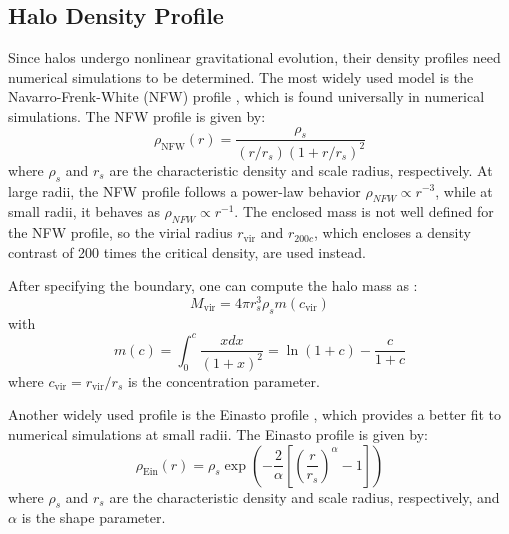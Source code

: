 \subsection{Halo Density Profile}
Since halos undergo nonlinear gravitational evolution, their density profiles need numerical simulations to be determined. The most widely used model is the Navarro-Frenk-White (NFW) profile \citep{1996ApJ...462..563N, 1997ApJ...490..493N}, which is found universally in numerical simulations. The NFW profile is given by:
\begin{equation}
    \rho_\text{NFW}(r) = \frac{\rho_s}{(r/r_s)(1 + r/r_s)^2}
\end{equation}
where $\rho_s$ and $r_s$ are the characteristic density and scale radius, respectively. At large radii, the NFW profile follows a power-law behavior $\rho_{NFW} \propto r^{-3}$, while at small radii, it behaves as $\rho_{NFW} \propto r^{-1}$. The enclosed mass is not well defined for the NFW profile, so the virial radius $r_{\text{vir}}$ and $r_{200c}$, which encloses a density contrast of 200 times the critical density, are used instead.

After specifying the boundary, one can compute the halo mass as \citep{2011MNRAS.414.1851O}:
\begin{equation}
    M_{\text{vir}} = 4\pi r_s^3 \rho_s m(c_{\text{vir}})
\end{equation}
with
\begin{equation}
    m(c) = \int_0^{c} \frac{x dx}{(1 + x)^2} = \ln(1 + c) - \frac{c}{1 + c}
\end{equation}
where $c_{\text{vir}} = r_{\text{vir}}/r_s$ is the concentration parameter. 

Another widely used profile is the Einasto profile \citep{1965TrAlm...5...87E}, which provides a better fit to numerical simulations at small radii. The Einasto profile is given by:
\begin{equation}
    \rho_{\text{Ein}}(r) = \rho_s \exp \left( -\frac{2}{\alpha} \left[ \left( \frac{r}{r_s} \right)^\alpha - 1 \right] \right)
\end{equation}
where $\rho_s$ and $r_s$ are the characteristic density and scale radius, respectively, and $\alpha$ is the shape parameter. 